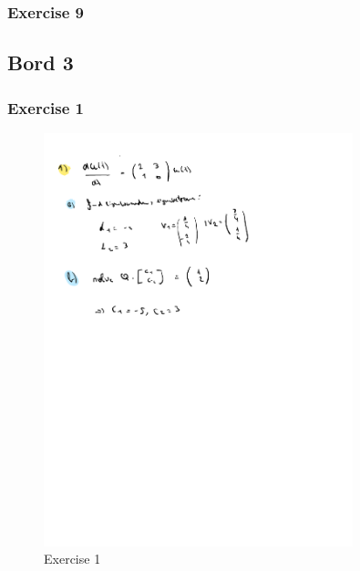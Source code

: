 \documentclass[a4paper]{report}
\begin{document}
\subsubsection{Exercise 9}




\subsection{Bord 3}

\subsubsection{Exercise 1}

\begin{figure}[H]
	\centering
	\includegraphics[width=0.8\textwidth]{assets/bord_3_ex_1.pdf}
	\caption{Exercise 1}
\end{figure}
\end{document}
